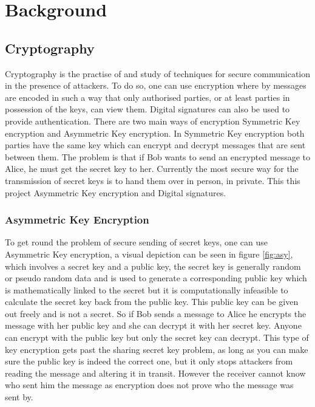 
\chapter{Background}
\label{back}

\section{Cryptography}

Cryptography is the practise of and study of techniques for secure communication in the presence of attackers. To do so, one can use encryption where by messages are encoded in such a way that only authorised parties, or at least parties in possession of the keys, can view them. Digital signatures can also be used to provide authentication. There are two main ways of encryption Symmetric Key encryption and Asymmetric Key encryption. In Symmetric Key encryption both parties have the same key which can encrypt and decrypt messages that are sent between them. The problem is that if Bob wants to send an encrypted message to Alice, he must get the secret key to her. Currently the most secure way for the transmission of secret keys is to hand them over in person, in private. This this project Asymmetric Key encryption and Digital signatures.


\subsection{Asymmetric Key Encryption}

To get round the problem of secure sending of secret keys, one can use Asymmetric Key encryption, a visual depiction can be seen in figure \ref{fig:asy}, which involves a secret key and a public key, the secret key is generally random or pseudo random data and is used to generate a corresponding public key which is mathematically linked to the secret but it is computationally infeasible to calculate the secret key back from the public key. This public key can be given out freely and is not a secret. So if Bob sends a message to Alice he encrypts the message with her public key and she can decrypt it with her secret key. Anyone can encrypt with the public key but only the secret key can decrypt. This type of key encryption gets past the sharing secret key problem, as long as you can make sure the public key is indeed the correct one, but it only stops attackers from reading the message and altering it in transit. However the receiver cannot know who sent him the message as encryption does not prove who the message was sent by. 

